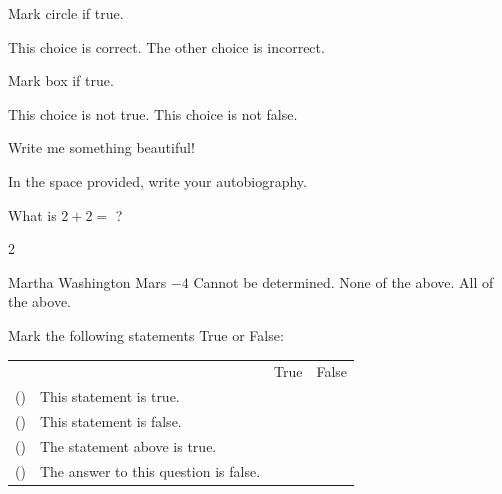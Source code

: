 \documentclass[12pt,letterpaper]{exam}
\newcounter{thepart}
\renewcommand{\thepart}{\stepcounter{thepart}\alph{thepart}}
\newcommand{\cmark}{\ding{51}}
\newcommand{\pspace}{\par\vspace{\baselineskip}}
\begin{document}
\begin{questions}
\vspace{3cm}
\question[1] Mark circle if true.
	\begin{checkboxes}
	\choice This choice is correct.
	\choice The other choice is incorrect. 
	\end{checkboxes}


\vspace{3cm}
{
\checkboxchar{$\Box$}
\question[3] Mark box if true.
	\begin{checkboxes}
	\choice This choice is not true.
	\choice This choice is not false. 
	\end{checkboxes}
}


\newpage
\question[1] Write me something beautiful! 
\fillwithlines{\fill}


\newpage
\question[1] In the space provided, write your autobiography. 
\fillwithdottedlines{27em}


\newpage
{%
\question[1] What is $2+2=$ ?
	\begin{multicols}{2}
	\begin{choices}
	\choice Martha Washington
	\choice Mars
	\choice $-4$
	\choice Cannot be determined.
	\choice None of the above.
	\choice All of the above.
	\end{choices}
	\end{multicols}
}%


\newpage
\question[10] Mark the following statements True or False: \pspace
\def\arraystretch{1.5} %
\noindent\begin{tabularx}{\textwidth}{cXcc}
 & & True & False \\
(\thepart) & This statement is true. & \boxed{\phantom{\cmark}} & \boxed{\phantom{\cmark}} \\ 

(\thepart) & This statement is false. & \boxed{\phantom{\cmark}} & \boxed{\phantom{\cmark}} \\[3cm]

(\thepart) & The statement above is true. & \boxed{\phantom{\cmark}} & \boxed{\phantom{\cmark}} \\

(\thepart) & The answer to this question is false. & \boxed{\phantom{\cmark}} & \boxed{\phantom{\cmark}}
\end{tabularx}



\end{questions}
\end{document}

